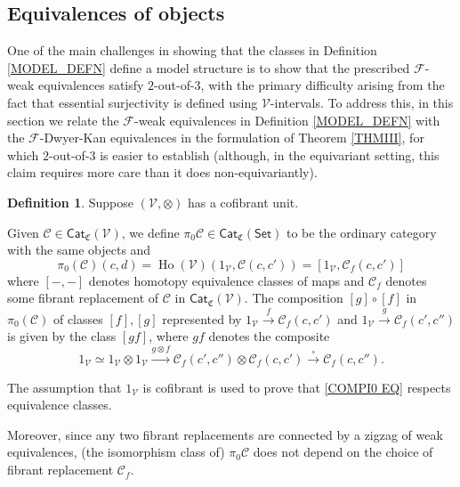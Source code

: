 \documentclass[a4paper,10pt
,draft
]{article}%
\numberwithin{equation}{section}
\numberwithin{figure}{section}
\theoremstyle{definition} %
\newtheorem{definition}[equation]{Definition}%
\newtheorem{remark}[equation]{Remark}%
\newcommand{\Cat}{\mathsf{Cat}}
\DeclareMathOperator{\Ho}{Ho}
\newcommand{\F}{\ensuremath{\mathcal F}}
\newcommand{\V}{\ensuremath{\mathcal V}}
\newcommand{\1}{\ensuremath{\mathbbm 1}}%
\begin{document}
\subsection{Equivalences of objects}\label{EQUIVOBJ_SEC}



One of the main challenges in showing that the classes in Definition \ref{MODEL_DEFN} define a model structure
is to show that the prescribed 
$\F$-weak equivalences satisfy $2$-out-of-$3$,
with the primary difficulty arising from the fact that essential surjectivity is 
defined using $\V$-intervals.
%
To address this, in this section we relate the $\F$-weak equivalences
in Definition \ref{MODEL_DEFN} with the $\F$-Dwyer-Kan equivalences
in the formulation of Theorem \ref{THMIII},
for which $2$-out-of-$3$ is easier to establish
(although, in the equivariant setting, 
this claim requires more care than it does non-equivariantly).


\begin{definition}\label{HTPY_DEFN}
	Suppose $(\V,\otimes)$ has a cofibrant unit.

	Given $\mathcal C \in \Cat_{\mathfrak{C}}(\V)$,
	we define $\pi_0 \mathcal C \in \Cat_{\mathfrak{C}}(\mathsf{Set})$ 
	to be the ordinary category with the same objects and
\[
	\pi_0(\mathcal{C})(c,d)=
	\Ho(\V)(1_\V, \mathcal C(c,c'))=
	[1_\V, \mathcal{C}_f(c,c')]
\]
where $[-,-]$ denotes homotopy equivalence classes of maps
and $\mathcal{C}_f$ denotes some fibrant replacement of
$\mathcal C$ in $\Cat_{\mathfrak{C}}(\V)$.
The composition $[g]\circ [f]$
in $\pi_0(\mathcal{C})$
of classes $[f],[g]$
represented by
$1_{\mathcal{V}} \xrightarrow{f} \mathcal{C}_f({c,c'})$
and 
$1_{\mathcal{V}} \xrightarrow{g} \mathcal{C}_f({c',c''})$
is given by the class $[gf]$, where $gf$ denotes the composite
\begin{equation}\label{COMPI0 EQ}
1_{\mathcal{V}} \simeq
1_{\mathcal{V}} \otimes 1_{\mathcal{V}} \xrightarrow{g \otimes f}
\mathcal{C}_f({c',c''}) \otimes  \mathcal{C}_f({c,c'}) \xrightarrow{\circ}
\mathcal{C}_f({c,c''}).
\end{equation}
\end{definition}


The assumption that $1_{\mathcal{V}}$ is cofibrant
is used to prove that \eqref{COMPI0 EQ}
respects equivalence classes. 

Moreover, since any two fibrant replacements are connected by a zigzag of weak equivalences,
(the isomorphism class of) $\pi_0 \mathcal{C}$ does not depend on the choice of fibrant replacement $\mathcal{C}_f$.
\end{document}
